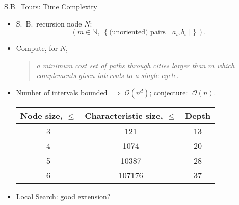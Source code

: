 \documentclass[
  size=8pt,
  style=klope,
  paper=screen,
  pauseslide,
  nopagebreaks,
  hlsections,
  fleqn
]{powerdot}
\def\todo{\color{red}}
\begin{document}
\begin{slide}[toc=]{S.B.\ Tours: Time Complexity}
  \begin{itemize}
  \item
    S.\ B.\ recursion node $N$:
    \begin{equation}
    \left(m \in \mathbb{N}, \;
      \left\{ \text{(unoriented) pairs} \; [a_i,b_i] \right\} \right).
    \end{equation}
    \vspace{-5mm}
  \item
    Compute, for $N$,
    \begin{quote}
    {\small \itshape
      a minimum cost set of paths through cities larger than $m$
      which complements given intervals to a single cycle.
    }
    \end{quote}
  \item
    Number of intervals bounded $\;\Rightarrow\; \mathcal{O}\left(n^d\right)$;
    conjecture: $\;\mathcal{O}\left(n\right)$. %
    {\small
    \begin{table}[htpb]
    \centering
    \begin{tabular}{cSc}
      \toprule
      {\bfseries Node size, $\leq$ } &
      {\bfseries Characteristic size, $\leq$} &
      {\bfseries Depth } \\
      \midrule
      3 &    121 & 13 \\
      4 &   1074 & 20 \\
      5 &  10387 & 28 \\
      6 & 107176 & 37 \\
      \bottomrule
    \end{tabular}
    \end{table}
    }
  \item
  Local Search: good extension?
  \end{itemize}
\end{slide}

\end{document}
